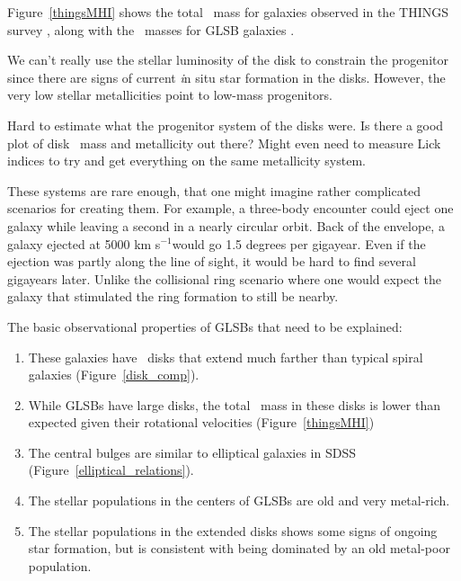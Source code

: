 \documentclass{emulateapj}
\newcommand\kms{km s$^{-1}$}
\newcommand\HI{\ion{H}{1}}
\begin{document}
Figure~\ref{thingsMHI} shows the total \HI\ mass for galaxies observed in the THINGS survey \citep{Walter2008}, along with the \HI\ masses for GLSB galaxies \citep{Pickering97}.  

We can't really use the stellar luminosity of the disk to constrain the progenitor since there are signs of current {\emph in situ} star formation in the disks.  However, the very low stellar metallicities point to low-mass progenitors.  

Hard to estimate what the progenitor system of the disks were.  Is there a good plot of disk \HI\ mass and metallicity out there?  Might even need to measure Lick indices to try and get everything on the same metallicity system.

These systems are rare enough, that one might imagine rather complicated scenarios for creating them.  For example, a three-body encounter could eject one galaxy while leaving a second in a nearly circular orbit.  Back of the envelope, a galaxy ejected at 5000 \kms would go 1.5 degrees per gigayear.  Even if the ejection was partly along the line of sight, it would be hard to find several gigayears later.  Unlike the collisional ring scenario where one would expect the galaxy that stimulated the ring formation to still be nearby.


The basic observational properties of GLSBs that need to be explained:
\begin{enumerate}
\item{These galaxies have \HI\ disks that extend much farther than typical spiral galaxies (Figure~\ref{disk_comp}). }
\item{While GLSBs have large disks, the total \HI\ mass in these disks is lower than expected given their rotational velocities (Figure~\ref{thingsMHI})}
\item{The central bulges are similar to elliptical galaxies in SDSS (Figure~\ref{elliptical_relations}).}
\item{The stellar populations in the centers of GLSBs are old and very metal-rich.}
\item{The stellar populations in the extended disks shows some signs of ongoing star formation, but is consistent with being dominated by an old metal-poor population.}
\end{enumerate}

\begin{figure*}
\caption{Comparison of GLSB \HI\ masses \citep{Pickering97} with \HI\ masses measured in the THINGS survey \citep{Walter2008}.  While the \HI\ masses in the GLSB systems are high, they are consistent with what would be available in a merger with a V$_{\rm{max}}\sim$110 km/s or smaller galaxy, assuming the merger did not trigger large amounts of star formation and feedback. \label{thingsMHI}}
\end{figure*}
\end{document}
